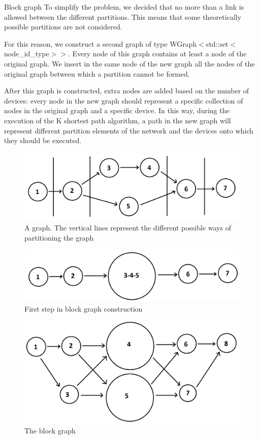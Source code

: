 \begin{frame}[allowframebreaks]{Block graph}
    To simplify the problem, we decided that no more than a link is allowed between the different partitions. This means that some theoretically possible partitions are not considered. 
    
    For this reason, we construct a second graph of type WGraph$<$std::set$<$node\_id\_type$>>$. Every node of this graph contains at least a node of the original graph. We insert in the same node of the new graph all the nodes of the original graph between which a partition cannot be formed.
    
    \framebreak
    
    After this graph is constructed, extra nodes are added based on the number of devices: every node in the new graph should represent a specific collection of nodes in the original graph and a specific device. In this way, during the execution of the K shortest path algorithm, a path in the new graph will represent different partition elements of the network and the devices onto which they should be executed.
    
        \begin{figure}[h]
        \centering
    \includegraphics[width=0.4\linewidth]{Img/butcher/basic_graph.png}
    \caption{A graph. The vertical lines represent the different possible ways of partitioning the graph}
    \end{figure}
    
    \framebreak
    
        \begin{figure}[h]
        \centering
    \includegraphics[width=0.4\linewidth]{Img/butcher/linearized_graph.png}
    \caption{First step in block graph construction}
    \end{figure}
    
    \begin{multicols}{2}
        \begin{figure}[h]
        \centering
    \includegraphics[width=0.75\linewidth]{Img/butcher/block_graph.png}
    \caption{The block graph}
    \end{figure}
    

\end{multicols}
\end{frame}
